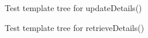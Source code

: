 \documentclass{article}
\begin{document}
\begin{figure}[hbt!]        
\caption{\label{1} Test template tree for updateDetails()}      
\end{figure}
\begin{figure}[t!]        
\caption{\label{1} Test template tree for retrieveDetails()}      
\end{figure}
\end{document}
